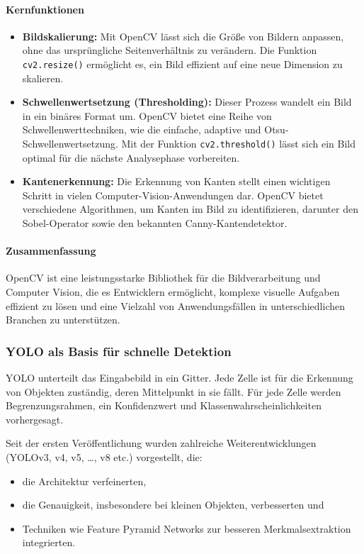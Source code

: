 \paragraph{Kernfunktionen}
\begin{itemize}
    \item \textbf{Bildskalierung:} Mit OpenCV lässt sich die Größe von Bildern anpassen, ohne das ursprüngliche Seitenverhältnis zu verändern. Die Funktion \texttt{cv2.resize()} ermöglicht es, ein Bild effizient auf eine neue Dimension zu skalieren.
    \item \textbf{Schwellenwertsetzung (Thresholding):} Dieser Prozess wandelt ein Bild in ein binäres Format um. OpenCV bietet eine Reihe von Schwellenwerttechniken, wie die einfache, adaptive und Otsu-Schwellenwertsetzung. Mit der Funktion \texttt{cv2.threshold()} lässt sich ein Bild optimal für die nächste Analysephase vorbereiten.
    \item \textbf{Kantenerkennung:} Die Erkennung von Kanten stellt einen wichtigen Schritt in vielen Computer-Vision-Anwendungen dar. OpenCV bietet verschiedene Algorithmen, um Kanten im Bild zu identifizieren, darunter den Sobel-Operator sowie den bekannten Canny-Kantendetektor.
\end{itemize}

\paragraph{Zusammenfassung}
OpenCV ist eine leistungsstarke Bibliothek für die Bildverarbeitung und Computer Vision, die es Entwicklern ermöglicht, komplexe visuelle Aufgaben effizient zu lösen und eine Vielzahl von Anwendungsfällen in unterschiedlichen Branchen zu unterstützen.

\subsubsection{YOLO als Basis für schnelle Detektion}

YOLO unterteilt das Eingabebild in ein Gitter. Jede Zelle ist für die Erkennung von Objekten zuständig, deren Mittelpunkt in sie fällt. Für jede Zelle werden Begrenzungsrahmen, ein Konfidenzwert und Klassenwahrscheinlichkeiten vorhergesagt. 

Seit der ersten Veröffentlichung wurden zahlreiche Weiterentwicklungen (YOLOv3, v4, v5, \ldots, v8 etc.) vorgestellt, die:
\begin{itemize}
    \item die Architektur verfeinerten,
    \item die Genauigkeit, insbesondere bei kleinen Objekten, verbesserten und
    \item Techniken wie Feature Pyramid Networks zur besseren Merkmalsextraktion integrierten.
\end{itemize}


